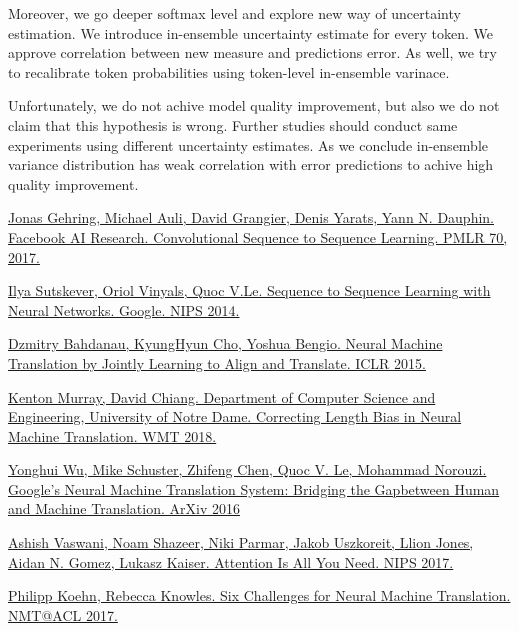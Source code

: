 \documentclass[a4paper,14pt]{extarticle}
\begin{document}
	Moreover, we go deeper softmax level and explore new way of uncertainty estimation. We introduce in-ensemble uncertainty estimate for every token. We approve correlation between new measure and predictions error. As well, we try to recalibrate token probabilities using token-level in-ensemble varinace.
	
	Unfortunately, we do not achive model quality improvement, but also we do not claim that this hypothesis is wrong. Further studies should conduct same experiments using different uncertainty estimates. As we conclude in-ensemble variance distribution has weak correlation with error predictions to achive high quality improvement.
	
	\begin{thebibliography}{0}		
		\hypertarget{fconv}{}
		\href{https://arxiv.org/pdf/1705.03122.pdf}
		{Jonas Gehring, Michael Auli, David Grangier, Denis Yarats, Yann N. Dauphin. Facebook AI Research. Convolutional Sequence to Sequence Learning. PMLR 70, 2017.}
		
		\hypertarget{seq2seq}{}
		\href{https://papers.nips.cc/paper/5346-sequence-to-sequence-learning-with-neural-networks.pdf}
		{Ilya Sutskever, Oriol Vinyals, Quoc V.Le. Sequence to Sequence Learning with Neural Networks. Google. NIPS 2014.}
		
		\hypertarget{encdec_att}{}
		\href{https://arxiv.org/pdf/1409.0473.pdf}
		{Dzmitry Bahdanau, KyungHyun Cho, Yoshua Bengio. Neural Machine Translation by Jointly Learning to Align and Translate. ICLR 2015.}
		
		\hypertarget{corr_len_bias}{}
		\href{https://arxiv.org/pdf/1808.10006.pdf}
		{Kenton Murray, David Chiang. Department of Computer Science and Engineering, University of Notre Dame. Correcting Length Bias in Neural Machine Translation. WMT 2018.}
		
		\hypertarget{gnmt}{}
		\href{https://arxiv.org/pdf/1609.08144.pdf}
		{Yonghui Wu, Mike Schuster, Zhifeng Chen, Quoc V. Le, Mohammad Norouzi. Google’s Neural Machine Translation System: Bridging the Gapbetween Human and Machine Translation. ArXiv 2016}
		
		\hypertarget{transformer}{}
		\href{https://arxiv.org/pdf/1706.03762.pdf}
		{Ashish Vaswani, Noam Shazeer, Niki Parmar, Jakob Uszkoreit, Llion Jones, Aidan N. Gomez, Lukasz Kaiser. Attention Is All You Need. NIPS 2017.}
		
		\hypertarget{six_chall}{}
		\href{https://arxiv.org/pdf/1706.03872.pdf}
		{Philipp Koehn, Rebecca Knowles. Six Challenges for Neural Machine Translation. NMT@ACL 2017.}
		

\end{thebibliography}
\end{document}
